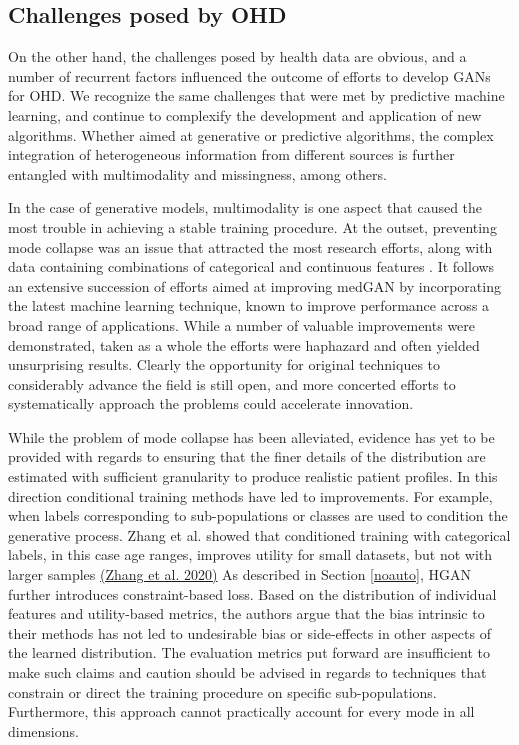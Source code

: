 \documentclass[10pt]{article}
\begin{document}
\subsection{Challenges posed by OHD}
On the other hand, the challenges posed by health data are obvious, and a number of recurrent factors influenced the outcome of efforts to develop GANs for OHD. We recognize the same challenges that were met by predictive machine learning, and continue to complexify the development and application of new algorithms. Whether aimed at generative or predictive algorithms, the complex integration of  heterogeneous information from different sources is further entangled with multimodality and missingness, among others.\par
In the case of generative models, multimodality is one aspect that  caused the most trouble in achieving a stable training procedure. At the outset, preventing mode collapse was an issue that attracted the most research efforts, along with data containing combinations of categorical and continuous features . It follows an extensive succession of efforts aimed at improving medGAN by incorporating the latest machine learning technique, known to improve performance across a broad range of applications. While a number of valuable improvements were demonstrated, taken as a whole the efforts were haphazard and often yielded unsurprising results. Clearly the opportunity for original techniques to considerably advance the field is still open, and more concerted efforts to systematically approach the problems could accelerate innovation.\par
While the problem of mode collapse has been alleviated, evidence has yet to be provided with regards to ensuring that the finer details of the distribution are estimated with sufficient granularity to produce realistic patient profiles. In this direction conditional training methods have led to improvements. For example, when labels corresponding to sub-populations or classes are used to condition the generative process. Zhang et al. showed that conditioned training with categorical labels, in this case age ranges, improves utility for small datasets, but not with larger samples \hyperref[csl:32]{(Zhang et al. 2020)} As described in Section \ref{noauto}, HGAN further introduces constraint-based loss. Based on the distribution of individual features and utility-based metrics, the authors argue that the bias intrinsic to their methods has not led to undesirable bias or side-effects in other aspects of the learned distribution. The evaluation metrics put forward are insufficient to make such claims and caution should be advised in regards to techniques that constrain or direct the training procedure on specific sub-populations. Furthermore, this approach cannot practically account for every mode in all dimensions.
\end{document}
